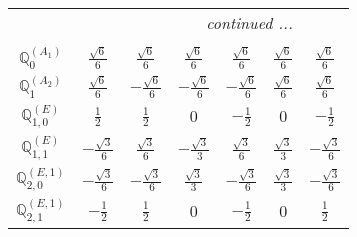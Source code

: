 \documentclass[fleqn,10pt,landscape]{article}
\begin{document}
\begin{itemize}
{\begin{center}
\begin{longtable}{ccccccc}
 \hline \hline
\multicolumn{6}{r}{\footnotesize\it continued ...} \\ \endfoot

 \hline \hline
\multicolumn{6}{r}{} \\ \endlastfoot

$\mathbb{Q}_{0}^{(A_{1})}$ & $ \frac{\sqrt{6}}{6} $ & $ \frac{\sqrt{6}}{6} $ & $ \frac{\sqrt{6}}{6} $ & $ \frac{\sqrt{6}}{6} $ & $ \frac{\sqrt{6}}{6} $ & $ \frac{\sqrt{6}}{6} $ \\ \hline
$\mathbb{Q}_{1}^{(A_{2})}$ & $ \frac{\sqrt{6}}{6} $ & $ - \frac{\sqrt{6}}{6} $ & $ - \frac{\sqrt{6}}{6} $ & $ - \frac{\sqrt{6}}{6} $ & $ \frac{\sqrt{6}}{6} $ & $ \frac{\sqrt{6}}{6} $ \\ \hline
$\mathbb{Q}_{1,0}^{(E)}$ & $ \frac{1}{2} $ & $ \frac{1}{2} $ & $ 0 $ & $ - \frac{1}{2} $ & $ 0 $ & $ - \frac{1}{2} $ \\ \hline
$\mathbb{Q}_{1,1}^{(E)}$ & $ - \frac{\sqrt{3}}{6} $ & $ \frac{\sqrt{3}}{6} $ & $ - \frac{\sqrt{3}}{3} $ & $ \frac{\sqrt{3}}{6} $ & $ \frac{\sqrt{3}}{3} $ & $ - \frac{\sqrt{3}}{6} $ \\ \hline
$\mathbb{Q}_{2,0}^{(E,1)}$ & $ - \frac{\sqrt{3}}{6} $ & $ - \frac{\sqrt{3}}{6} $ & $ \frac{\sqrt{3}}{3} $ & $ - \frac{\sqrt{3}}{6} $ & $ \frac{\sqrt{3}}{3} $ & $ - \frac{\sqrt{3}}{6} $ \\ \hline
$\mathbb{Q}_{2,1}^{(E,1)}$ & $ - \frac{1}{2} $ & $ \frac{1}{2} $ & $ 0 $ & $ - \frac{1}{2} $ & $ 0 $ & $ \frac{1}{2} $ \\
\end{longtable}
\end{center}
}
\end{itemize}
\end{document}

